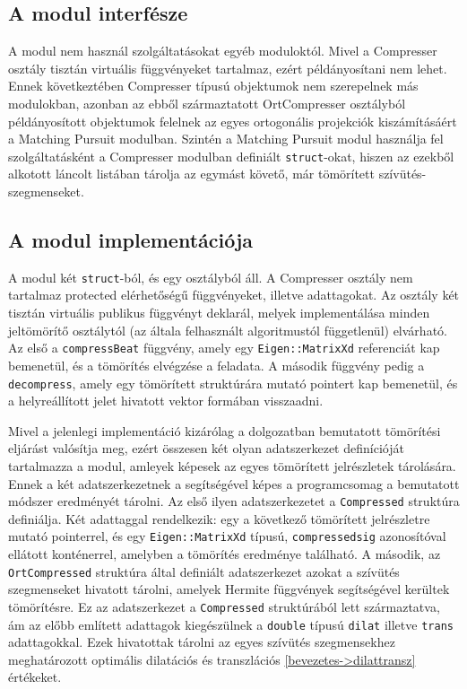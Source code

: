 \documentclass[oneside,titlepage,12pt,a4paper]{report}
\begin{document}
\subsection*{A modul interfésze}

\par A modul nem használ szolgáltatásokat egyéb moduloktól. Mivel a Compresser osztály tisztán virtuális függvényeket tartalmaz, ezért példányosítani nem lehet. Ennek következtében Compresser típusú objektumok nem szerepelnek más modulokban, azonban az ebből származtatott OrtCompresser osztályból példányosított objektumok felelnek az egyes ortogonális projekciók kiszámításáért a Matching Pursuit modulban. Szintén a Matching Pursuit modul használja fel szolgáltatásként a Compresser modulban definiált \texttt{struct}-okat, hiszen az ezekből alkotott láncolt listában tárolja az egymást követő, már tömörített szívütés-szegmenseket. 

\subsection*{A modul implementációja}

\par A modul két \texttt{struct}-ból, és egy osztályból áll. A Compresser osztály nem tartalmaz protected elérhetőségű függvényeket, illetve adattagokat. Az osztály két tisztán virtuális publikus függvényt deklarál, melyek implementálása minden jeltömörítő osztálytól (az általa felhasznált algoritmustól függetlenül) elvárható. Az első a \texttt{compressBeat} függvény, amely egy \texttt{Eigen::MatrixXd} referenciát kap bemenetül, és a tömörítés elvégzése a feladata. A második függvény pedig a \texttt{decompress}, amely egy tömörített struktúrára mutató pointert kap bemenetül, és a helyreállított jelet hivatott vektor formában visszaadni. 
\par Mivel a jelenlegi implementáció kizárólag a dolgozatban bemutatott tömörítési eljárást valósítja meg, ezért összesen két olyan adatszerkezet definícióját tartalmazza a modul, amleyek képesek az egyes tömörített jelrészletek tárolására. Ennek a két adatszerkezetnek a segítségével képes a programcsomag a bemutatott módszer eredményét tárolni. Az első ilyen adatszerkezetet a \texttt{Compressed} struktúra definiálja. Két adattaggal rendelkezik: egy a következő tömörített jelrészletre mutató pointerrel, és egy \texttt{Eigen::MatrixXd} típusú, \texttt{compressedsig} azonosítóval ellátott konténerrel, amelyben a tömörítés eredménye található. A második, az \texttt{OrtCompressed} struktúra által definiált adatszerkezet azokat a szívütés szegmenseket hivatott tárolni, amelyek Hermite függvények segítségével kerültek tömörítésre. Ez az adatszerkezet a \texttt{Compressed} struktúrából lett származtatva, ám az előbb említett adattagok kiegészülnek a \texttt{double} típusú \texttt{dilat} illetve \texttt{trans} adattagokkal. Ezek hivatottak tárolni az egyes szívütés szegmensekhez meghatározott optimális dilatációs és transzlációs \ref{bevezetes->dilattransz} értékeket.     
\end{document}
